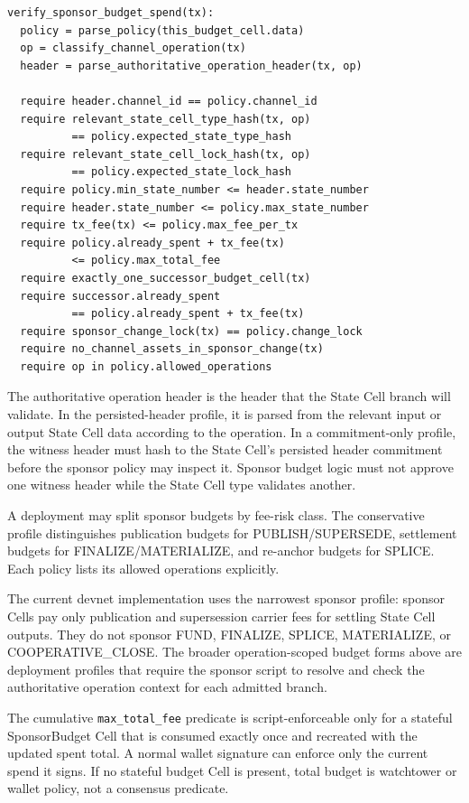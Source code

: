\documentclass[a4paper,11pt]{article}
\begin{document}
\begin{lstlisting}
verify_sponsor_budget_spend(tx):
  policy = parse_policy(this_budget_cell.data)
  op = classify_channel_operation(tx)
  header = parse_authoritative_operation_header(tx, op)

  require header.channel_id == policy.channel_id
  require relevant_state_cell_type_hash(tx, op)
          == policy.expected_state_type_hash
  require relevant_state_cell_lock_hash(tx, op)
          == policy.expected_state_lock_hash
  require policy.min_state_number <= header.state_number
  require header.state_number <= policy.max_state_number
  require tx_fee(tx) <= policy.max_fee_per_tx
  require policy.already_spent + tx_fee(tx)
          <= policy.max_total_fee
  require exactly_one_successor_budget_cell(tx)
  require successor.already_spent
          == policy.already_spent + tx_fee(tx)
  require sponsor_change_lock(tx) == policy.change_lock
  require no_channel_assets_in_sponsor_change(tx)
  require op in policy.allowed_operations
\end{lstlisting}

The authoritative operation header is the header that the State Cell branch
will validate. In the persisted-header profile, it is parsed from the relevant
input or output State Cell data according to the operation. In a
commitment-only profile, the witness header must hash to the State Cell's
persisted header commitment before the sponsor policy may inspect it. Sponsor
budget logic must not approve one witness header while the State Cell type
validates another.

A deployment may split sponsor budgets by fee-risk class. The conservative
profile distinguishes publication budgets for \textsf{PUBLISH}/\textsf{SUPERSEDE},
settlement budgets for \textsf{FINALIZE}/\textsf{MATERIALIZE}, and re-anchor
budgets for \textsf{SPLICE}. Each policy lists its allowed operations
explicitly.

The current devnet implementation uses the narrowest sponsor profile: sponsor
Cells pay only publication and supersession carrier fees for settling State Cell
outputs. They do not sponsor \textsf{FUND}, \textsf{FINALIZE},
\textsf{SPLICE}, \textsf{MATERIALIZE}, or \textsf{COOPERATIVE\_CLOSE}. The
broader operation-scoped budget forms above are deployment profiles that require
the sponsor script to resolve and check the authoritative operation context for
each admitted branch.

The cumulative \texttt{max\_total\_fee} predicate is script-enforceable only
for a stateful SponsorBudget Cell that is consumed exactly once and recreated
with the updated spent total. A normal wallet signature can enforce only the
current spend it signs. If no stateful budget Cell is present, total budget is
watchtower or wallet policy, not a consensus predicate.
\end{document}
